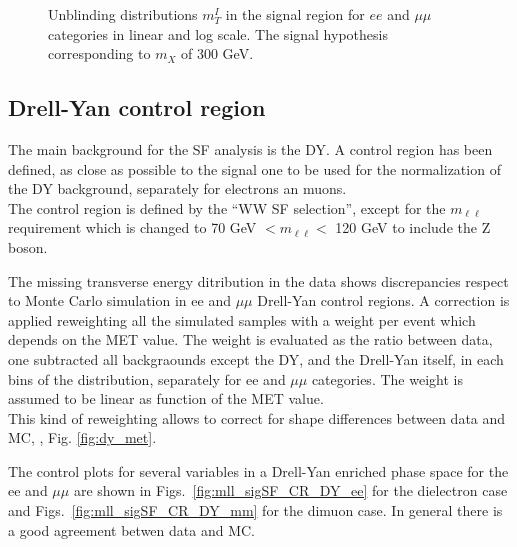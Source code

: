 \begin{figure}[htbp]
{}
\caption{Unblinding distributions  $m_T^I$ in the signal region for $ee$ and $\mu \mu$ categories in linear and log scale. The signal hypothesis corresponding to $m_X $ of 300 GeV.}
    \label{fig:mti_sigOF_Un}
\end{figure}




\newpage


\subsection*{Drell-Yan control region}
The main background for the SF analysis is the DY. 
A control region has been defined, as close as possible to the signal one to
be used for the normalization of the DY background, separately for electrons
an muons.\\
The control region is defined by the ``WW SF selection'', except for the
$m_{\ell \ell}$ requirement which is changed to 70 GeV $ <m_{\ell \ell} <$ 120
GeV to include the Z boson.

The missing transverse energy ditribution in the data shows discrepancies respect to Monte Carlo simulation  in ee and $\mu \mu$ Drell-Yan control regions. A correction is applied reweighting all the simulated samples with a weight per event which depends on the MET value. 
The weight is evaluated as the ratio between data, one subtracted all backgraounds except the DY, and the Drell-Yan itself, in each bins of the distribution, separately for ee and $\mu \mu$ categories. The weight is assumed to be linear as function of the MET value.\\
This kind of reweighting allows to correct for shape differences between data and MC, , Fig. \ref{fig:dy_met}.


The control plots for several variables in a Drell-Yan enriched phase space
for the ee and $\mu \mu$ are shown in Figs.~\ref{fig:mll_sigSF_CR_DY_ee} for
the dielectron case and Figs.~\ref{fig:mll_sigSF_CR_DY_mm} for the dimuon
case. In general there is a good agreement betwen data and MC.

